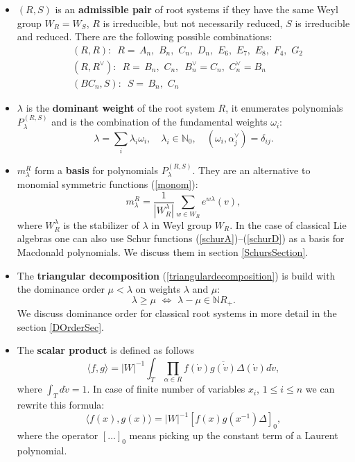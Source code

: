 \documentclass{article}
\begin{document}
\begin{itemize}
    \item $(R,S)$ is an \textbf{admissible pair} of root systems if they have the same Weyl group $W_R = W_S$, $R$ is irreducible, but not necessarily reduced, $S$ is irreducible and reduced. There are the following possible combinations:
\begin{align}
 &   (R,R):  \,\,\,  R = \, A_n,\,\,B_n, \,\, C_n,\,\,D_n, \,\, E_6,\,\,E_7, \,\, E_8,\,\,F_4, \,\, G_2 \\
 &   (R,R^{\vee}):  \,\,\, R = \,B_n, \,\, C_n, \,\,\, B_n^{\vee} = C_n, \,\, C_n^{\vee} = B_n \\
 & (BC_n, S): \,\,\, S= \, B_n, \,\, C_n
\end{align}
\item $\lambda$ is the \textbf{dominant weight} of the root system $R$, it enumerates polynomials $P_{\lambda}^{(R,S)}$ and is the combination of the fundamental weights $\omega_i$:
\begin{equation}
    \lambda = \sum_i \lambda_i \omega_i, \quad \lambda_i \in \mathds{N}_0,\quad (\omega_i,\alpha_j^{\vee}) = \delta_{ij}.
\end{equation}

\item $m_{\lambda}^R$ form a \textbf{basis} for polynomials $P_{\lambda}^{(R,S)}$. They are an alternative to monomial symmetric functions (\ref{monom}):
\begin{equation}
    m_{\lambda}^R = \frac{1}{|W_R^{\lambda}|} \sum_{w\in W_R} e^{w \lambda}(v), \label{MacBasis}
\end{equation}
where $W_R^{\lambda}$ is the stabilizer of $\lambda$ in Weyl group $W_R$. In the case of classical Lie algebras one can also use Schur functions (\ref{schurA})--(\ref{schurD}) as a basis for Macdonald polynomials. We discuss them in section \ref{SchursSection}.

\item The \textbf{triangular decomposition} (\ref{triangulardecomposition}) is build with the dominance order $\mu <\lambda $ on weights $\lambda$ and $\mu$:
\begin{equation}
    \lambda \geq \mu \,\, \Longleftrightarrow \,\, \lambda-\mu \in \mathbb{N} R_{+}.
\end{equation}
We discuss dominance order for classical root systems in more detail in the section \ref{DOrderSec}.
\item The \textbf{scalar product} is defined as follows
\begin{equation}
    \langle f,g \rangle = |W|^{-1} \int_T \prod_{\alpha \in R} f(\dot v) \overline{g(\dot v)} \Delta(\dot v) d \dot v,
\end{equation}
 where $\int_T d \dot v = 1$. In case of finite number of variables $x_i$, $1\leq i \leq n$ we can rewrite this formula:
\begin{equation}
     \langle f(x),g(x) \rangle = |W|^{-1} [f(x)g(x^{-1})\Delta]_0,
\end{equation}
where the operator $[\dots]_0$ means picking up the constant term of a Laurent polynomial.


\end{itemize}
\end{document}
